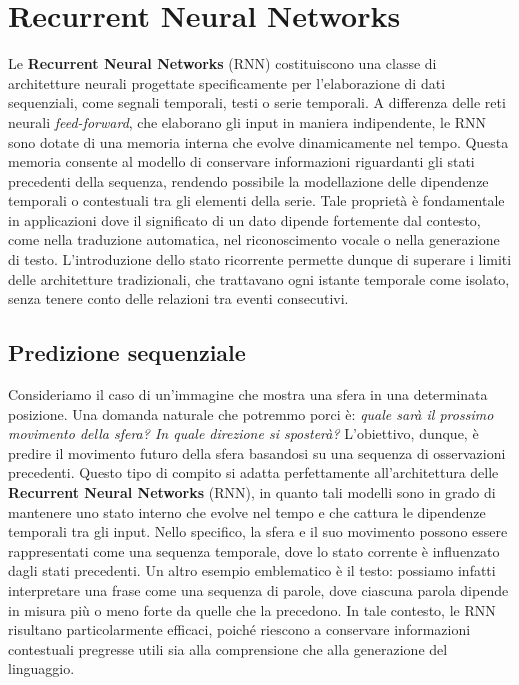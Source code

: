 \chapter{Recurrent Neural Networks}

Le \textbf{Recurrent Neural Networks} (RNN) costituiscono una classe di architetture neurali progettate specificamente per l’elaborazione di dati sequenziali, come segnali temporali, testi o serie temporali. A differenza delle reti neurali \textit{feed-forward}, che elaborano gli input in maniera indipendente, le RNN sono dotate di una memoria interna che evolve dinamicamente nel tempo. Questa memoria consente al modello di conservare informazioni riguardanti gli stati precedenti della sequenza, rendendo possibile la modellazione delle dipendenze temporali o contestuali tra gli elementi della serie. Tale proprietà è fondamentale in applicazioni dove il significato di un dato dipende fortemente dal contesto, come nella traduzione automatica, nel riconoscimento vocale o nella generazione di testo. L'introduzione dello stato ricorrente permette dunque di superare i limiti delle architetture tradizionali, che trattavano ogni istante temporale come isolato, senza tenere conto delle relazioni tra eventi consecutivi.

\section{Predizione sequenziale}

Consideriamo il caso di un'immagine che mostra una sfera in una determinata posizione. Una domanda naturale che potremmo porci è: \textit{quale sarà il prossimo movimento della sfera? In quale direzione si sposterà?} L'obiettivo, dunque, è predire il movimento futuro della sfera basandosi su una sequenza di osservazioni precedenti. Questo tipo di compito si adatta perfettamente all'architettura delle \textbf{Recurrent Neural Networks} (RNN), in quanto tali modelli sono in grado di mantenere uno stato interno che evolve nel tempo e che cattura le dipendenze temporali tra gli input. Nello specifico, la sfera e il suo movimento possono essere rappresentati come una sequenza temporale, dove lo stato corrente è influenzato dagli stati precedenti. Un altro esempio emblematico è il testo: possiamo infatti interpretare una frase come una sequenza di parole, dove ciascuna parola dipende in misura più o meno forte da quelle che la precedono. In tale contesto, le RNN risultano particolarmente efficaci, poiché riescono a conservare informazioni contestuali pregresse utili sia alla comprensione che alla generazione del linguaggio.

